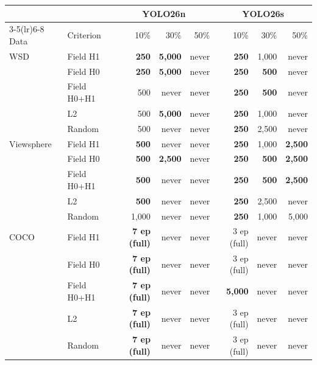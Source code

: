 \begin{tabular}{llrrrrrr}
\toprule
 & & \multicolumn{3}{c}{YOLO26n} & \multicolumn{3}{c}{YOLO26s} \\
\cmidrule(lr){3-5}\cmidrule(lr){6-8}
Data & Criterion & 10\% & 30\% & 50\% & 10\% & 30\% & 50\% \\
\midrule
WSD & Field H1 & \textbf{250} & \textbf{5,000} & never & \textbf{250} & 1,000 & never \\
 & Field H0 & \textbf{250} & \textbf{5,000} & never & \textbf{250} & \textbf{500} & never \\
 & Field H0+H1 & 500 & never & never & \textbf{250} & \textbf{500} & never \\
 & L2 & 500 & \textbf{5,000} & never & \textbf{250} & 1,000 & never \\
 & Random & 500 & never & never & \textbf{250} & 2,500 & never \\
\midrule
Viewsphere & Field H1 & \textbf{500} & never & never & \textbf{250} & 1,000 & \textbf{2,500} \\
 & Field H0 & \textbf{500} & \textbf{2,500} & never & \textbf{250} & \textbf{500} & \textbf{2,500} \\
 & Field H0+H1 & \textbf{500} & never & never & \textbf{250} & \textbf{500} & \textbf{2,500} \\
 & L2 & \textbf{500} & never & never & \textbf{250} & 2,500 & never \\
 & Random & 1,000 & never & never & \textbf{250} & 1,000 & 5,000 \\
\midrule
COCO & Field H1 & \textbf{7 ep (full)} & never & never & 3 ep (full) & never & never \\
 & Field H0 & \textbf{7 ep (full)} & never & never & 3 ep (full) & never & never \\
 & Field H0+H1 & \textbf{7 ep (full)} & never & never & \textbf{5,000} & never & never \\
 & L2 & \textbf{7 ep (full)} & never & never & 3 ep (full) & never & never \\
 & Random & \textbf{7 ep (full)} & never & never & 3 ep (full) & never & never \\
\bottomrule
\end{tabular}
